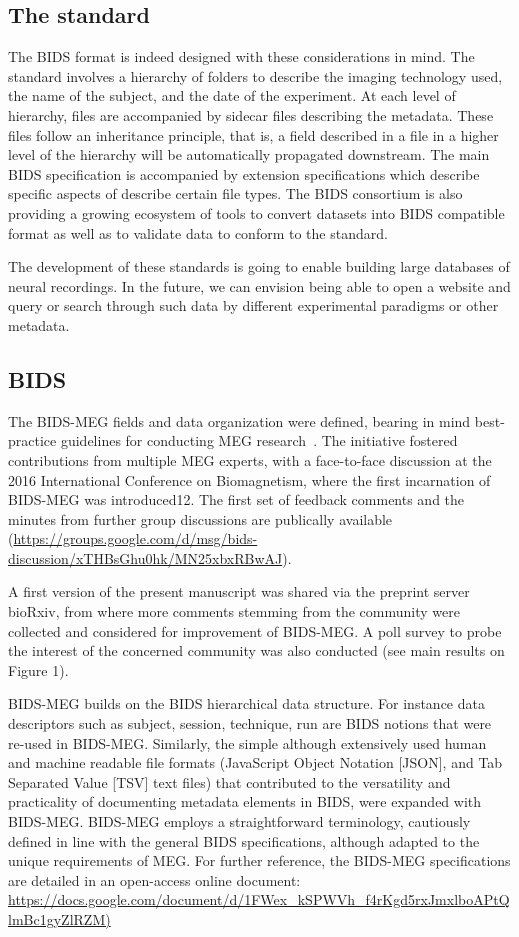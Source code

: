 \subsection{The standard}
The BIDS format is indeed designed with these considerations in mind. The standard involves a hierarchy of folders to describe the imaging technology used, the name of the subject, and the date of the experiment. At each level of hierarchy, files are accompanied by sidecar  files describing the metadata. These files follow an inheritance principle, that is, a field described in a  file in a higher level of the hierarchy will be automatically propagated downstream. The main BIDS specification is accompanied by extension specifications which describe specific aspects of describe certain file types. The BIDS consortium is also providing a growing ecosystem of tools to convert datasets into BIDS compatible format as well as to validate data to conform to the standard. 

The development of these standards is going to enable building large databases of neural recordings. In the future, we can envision being able to open a website and query or search through such data by different experimental paradigms or other metadata.

\subsection{BIDS}

The BIDS-MEG fields and data organization were defined, bearing in mind best-practice guidelines for conducting MEG research~\citep{gross2013good}. The initiative fostered contributions from multiple MEG experts, with a face-to-face discussion at the 2016 International Conference on Biomagnetism, where the first incarnation of BIDS-MEG was introduced12. The first set of feedback comments and the minutes from further group discussions are publically available
(\url{https://groups.google.com/d/msg/bids-discussion/xTHBsGhu0hk/MN25xbxRBwAJ}).

A first version of the present manuscript was shared via the preprint server bioRxiv, from where more comments stemming from the community were collected and considered for improvement of BIDS-MEG. A poll survey to probe the interest of the concerned community was also conducted (see main results on Figure 1).

BIDS-MEG builds on the BIDS hierarchical data structure. For instance data descriptors such as subject, session, technique, run are BIDS notions that were re-used in BIDS-MEG. Similarly, the simple although extensively used human and machine readable file formats (JavaScript Object Notation [JSON], and Tab Separated Value [TSV] text files) that contributed to the versatility and practicality of documenting metadata elements in BIDS, were expanded with BIDS-MEG. BIDS-MEG employs a straightforward terminology, cautiously defined in line with the general BIDS specifications, although adapted to the unique requirements of MEG.  For further reference, the BIDS-MEG specifications are detailed in an open-access online document:
\url{https://docs.google.com/document/d/1FWex_kSPWVh_f4rKgd5rxJmxlboAPtQlmBc1gyZlRZM)}

